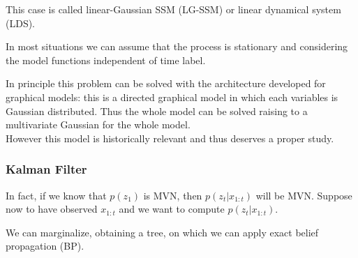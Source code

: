 \documentclass{article}
\begin{document}
This case is called linear-Gaussian SSM (LG-SSM) or linear dynamical system (LDS).

In most situations we can assume that the process is stationary and considering the model functions independent of time label.

In principle this problem can be solved with the architecture developed for graphical models: this is a directed graphical model in which each variables is Gaussian distributed. Thus the whole model can be solved raising to a multivariate Gaussian for the whole model.\\
However this model is historically relevant and thus deserves a proper study.

\subsubsection{Kalman Filter}
In fact, if we know that $p(z_1)$ is MVN, then $p(z_t|x_{1:t})$ will be MVN.
Suppose now to have observed $x_{1:t}$ and we want to compute $p(z_t|x_{1:t})$.

\begin{center}
\end{center}

We can marginalize, obtaining a tree, on which we can apply exact belief propagation (BP).

\begin{center}
\end{center}
\end{document}
